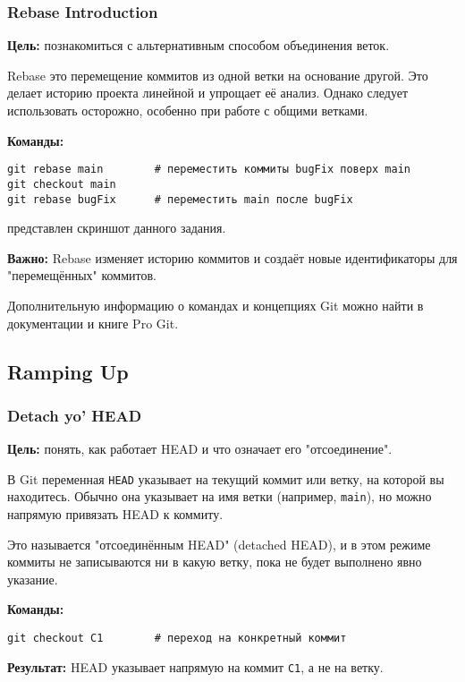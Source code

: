 \documentclass[a4paper,12pt]{report}
\begin{document}
\subsubsection{Rebase Introduction}
\textbf{Цель:} познакомиться с альтернативным способом объединения веток.

Rebase \textendash{} это перемещение коммитов из одной ветки на основание другой. Это делает историю проекта линейной и упрощает её анализ. Однако следует использовать осторожно, особенно при работе с общими ветками.

\textbf{Команды:}
\begin{verbatim}
git rebase main        # переместить коммиты bugFix поверх main
git checkout main
git rebase bugFix      # переместить main после bugFix
\end{verbatim}

 представлен скриншот данного задания.

\textbf{Важно:} Rebase изменяет историю коммитов и создаёт новые идентификаторы для "перемещённых" коммитов.

Дополнительную информацию о командах и концепциях Git можно найти в документации и книге Pro Git.

\subsection{Ramping Up}

\subsubsection{Detach yo' HEAD}
\textbf{Цель:} понять, как работает HEAD и что означает его "отсоединение".

В Git переменная \texttt{HEAD} указывает на текущий коммит или ветку, на которой вы находитесь. Обычно она указывает на имя ветки (например, \texttt{main}), но можно напрямую привязать HEAD к коммиту.

Это называется "отсоединённым HEAD" (detached HEAD), и в этом режиме коммиты не записываются ни в какую ветку, пока не будет выполнено явно указание.

\textbf{Команды:}
\begin{verbatim}
git checkout C1        # переход на конкретный коммит
\end{verbatim}

\textbf{Результат:} HEAD указывает напрямую на коммит \texttt{C1}, а не на ветку.
\end{document}

